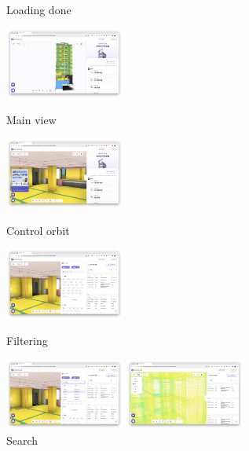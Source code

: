 \begin{itemize}[label=]
\begin{itemize}[label=]
\begin{figure}[!ht]
\begin{fullwidth}
{					            \caption*{Loading done}
				            }\qquad
				            \parbox{0.35\textwidth}{
					            \centering
					            \includegraphics[width=0.35\textwidth]{images/builderhub-curation-main.png}
					            \caption*{Main view}
				            }\qquad
				            \parbox{0.35\textwidth}{
					            \centering
					            \includegraphics[width=0.35\textwidth]{images/builderhub-curation-control.png}
					            \caption*{Control orbit}
				            }
				            \parbox{0.35\textwidth}{
					            \centering
					            \includegraphics[width=0.35\textwidth]{images/builderhub-curation-filter.png}
					            \caption*{Filtering}
				            }\qquad
				            \parbox{0.35\textwidth}{
					            \centering
					            \includegraphics[width=0.35\textwidth]{images/builderhub-curation-filter-search.png}
					            \caption*{Search}
				            }\qquad
				            \parbox{0.35\textwidth}{
					            \centering
					            \includegraphics[width=0.35\textwidth]{images/builderhub-curation-filter-material.png}
}
\end{fullwidth}
\end{figure}
\end{itemize}
\end{itemize}
